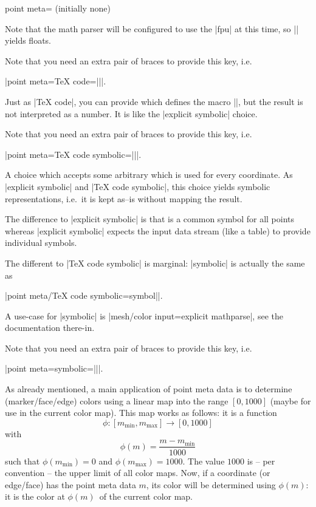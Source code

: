 \begin{pgfplotskey}{point meta= (initially none)}
\begin{description}
		Note that the math parser will be configured to use the |fpu| at this time, so |\pgfmathparse| yields floats. 

		Note that you need an extra pair of braces to provide this key, i.e.
		
		|point meta={TeX code=||}|.

		\item[\normalfont\declaretext{TeX code symbolic}\texttt{=}\meta{code}] Just as |TeX code|, you can provide  which defines the macro |\pgfplotspointmeta|, but the result is not interpreted as a number. It is like the |explicit symbolic| choice.

		Note that you need an extra pair of braces to provide this key, i.e.
		
		|point meta={TeX code symbolic=||}|.
		
		\item[\normalfont\declaretext{symbolic}\texttt{=}\meta{symbol}] A choice which accepts some arbitrary  which is used for every coordinate. As |explicit symbolic| and |TeX code symbolic|, this choice yields symbolic representations, i.e.\ it is kept as--is without mapping the result.

		The difference to |explicit symbolic| is that  is a common symbol for all points whereas |explicit symbolic| expects the input data stream (like a table) to provide individual symbols.

		The different to |TeX code symbolic| is marginal: |symbolic| is actually the same as 

		|point meta/TeX code symbolic={\def\pgfplotspointmeta|\marg{symbol}|}|.

		A use-case for |symbolic| is |mesh/color input=explicit mathparse|, see the documentation there-in.

		Note that you need an extra pair of braces to provide this key, i.e.
		
		|point meta={symbolic=||}|.
	\end{description}

	As already mentioned, a main application of point meta data is to determine (marker/face/edge) colors using a linear map into the range $[0,1000]$ (maybe for use in the current color map). This map works as follows: it is a function
	\[ \phi\colon [m_{\text{min}},m_{\text{max}}] \to [0,1000] \]
	with
	\[ \phi(m) = \frac{m - m_{\text{min}}} {1000} \]
	such that $\phi(m_{\text{min}}) = 0$ and $\phi(m_{\text{max}})=1000$. The value $1000$ is -- per convention -- the upper limit of all color maps. Now, if a coordinate (or edge/face) has the point meta data $m$, its color will be determined using $\phi(m)$: it is the color at $\phi(m)$\textperthousand\ of the current color map.


\end{pgfplotskey}
